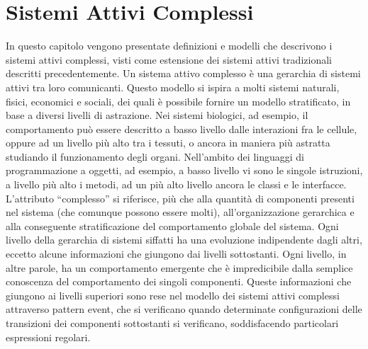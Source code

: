 \chapter{Sistemi Attivi Complessi}
In questo capitolo vengono presentate definizioni e modelli che descrivono i sistemi attivi complessi, visti come estensione dei sistemi attivi tradizionali descritti precedentemente. Un sistema attivo complesso è una gerarchia di sistemi attivi tra loro comunicanti. Questo modello si ispira a molti sistemi naturali, fisici, economici e sociali, dei quali è possibile fornire un modello stratificato, in base a diversi livelli di astrazione. Nei sistemi biologici, ad esempio, il comportamento può essere descritto a basso livello dalle interazioni fra le cellule, oppure ad un livello più alto tra i tessuti, o ancora in maniera più astratta studiando il funzionamento degli organi. Nell'ambito dei linguaggi di programmazione a oggetti, ad esempio, a basso livello vi sono le singole istruzioni, a livello più alto i metodi, ad un più alto livello ancora le classi e le interfacce. 
L'attributo ``complesso'' si riferisce, più che alla quantità di componenti presenti nel sistema (che comunque possono essere molti), all'organizzazione gerarchica e alla conseguente stratificazione del comportamento globale del sistema.
Ogni livello della gerarchia di sistemi siffatti ha una evoluzione indipendente dagli altri, eccetto alcune informazioni che giungono dai livelli sottostanti. Ogni livello, in altre parole, ha un comportamento emergente che è impredicibile dalla semplice conoscenza del comportamento dei singoli componenti. Queste informazioni che giungono ai livelli superiori sono rese nel modello dei sistemi attivi complessi attraverso pattern event, che si verificano quando determinate configurazioni delle transizioni dei componenti sottostanti si verificano, soddisfacendo particolari espressioni regolari.

\newpage
